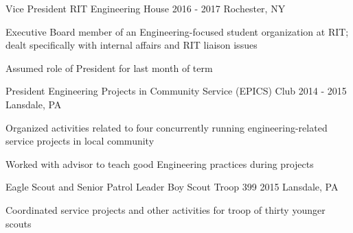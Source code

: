 \begin{cventries}
	\cventry
		{Vice President}
		{RIT Engineering House}
		{2016 - 2017}
		{Rochester, NY}
		{
			\begin{cvitems}
			\item {Executive Board member of an Engineering-focused student organization at RIT; dealt specifically with internal affairs and RIT liaison issues}
			\item {Assumed role of President for last month of term}
			\end{cvitems}
		}

	\cventry
		{President}
		{Engineering Projects in Community Service (EPICS) Club}
		{2014 - 2015}
		{Lansdale, PA}
		{
			\begin{cvitems}
			\item {Organized activities related to four concurrently running engineering-related service projects in local community}
			\item {Worked with advisor to teach good Engineering practices during projects}
			\end{cvitems}
		}

	\cventry
		{Eagle Scout and Senior Patrol Leader}
		{Boy Scout Troop 399}
		{2015}
		{Lansdale, PA}
		{
			\begin{cvitems}
			\item{Coordinated service projects and other activities for troop of thirty younger scouts}
			\end{cvitems}
		}
\end{cventries}
